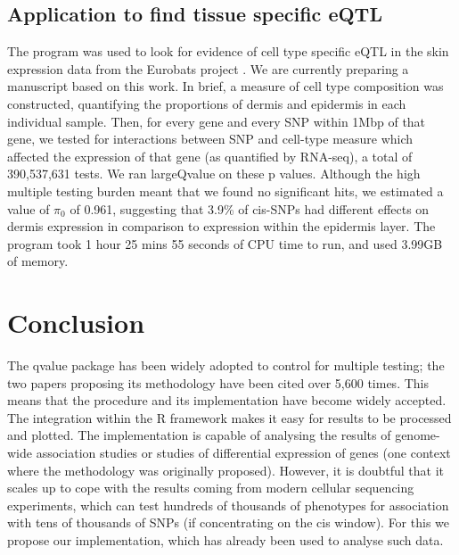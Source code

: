 \documentclass{amsart}
\begin{document}
\subsection{Application to find tissue specific eQTL}

The program was used to look for evidence of cell type specific eQTL in the skin expression data from the Eurobats project \citep{brownepistasis}. We are currently preparing a manuscript based on this work. In brief, a measure of cell type composition was constructed, quantifying the proportions of dermis and epidermis in each individual sample. Then, for every gene and every SNP within 1Mbp of that gene, we tested for interactions between SNP and cell-type measure which affected the expression of that gene (as quantified by RNA-seq), a total of 390,537,631 tests. We ran largeQvalue on these p values. Although the high multiple testing burden meant that we found no significant hits, we estimated a value of $\pi_0$ of 0.961, suggesting that 3.9\% of cis-SNPs had different effects on dermis expression in comparison to expression within the epidermis layer. The program took 1 hour 25 mins 55 seconds of CPU time to run, and used 3.99GB of memory.

\section{Conclusion}

The qvalue package has been widely adopted to control for multiple testing; the two papers proposing its methodology \citep{splinestorey, bootstorey} have been cited over 5,600 times. This means that the procedure and its implementation have become widely accepted. The integration within the R framework makes it easy for results to be processed and plotted. The implementation is capable of analysing the results of genome-wide association studies or studies of differential expression of genes (one context where the methodology was originally proposed). However, it is doubtful that it scales up to cope with the results coming from modern cellular sequencing experiments, which can test hundreds of thousands of phenotypes for association with tens of thousands of SNPs (if concentrating on the cis window). For this we propose our implementation, which has already been used to analyse such data.
\end{document}
